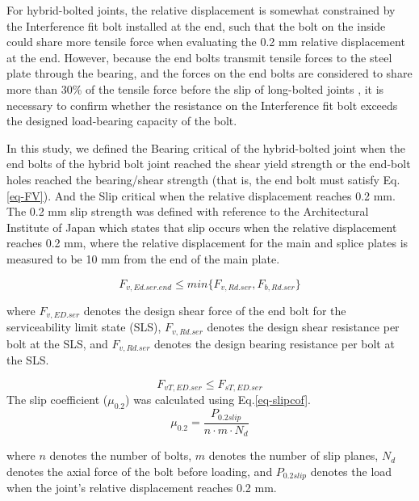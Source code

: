 For hybrid-bolted joints, the relative displacement is somewhat constrained by the Interference fit bolt installed at the end, such that the bolt on the inside could share more tensile force when evaluating the 0.2 mm relative displacement at the end. However, because the end bolts transmit tensile forces to the steel plate through the bearing, and the forces on the end bolts are considered to share more than 30\% of the tensile force before the slip of long-bolted joints \cite{Zhanghuazhi2000,chinarailway2005}, it is necessary to confirm whether the resistance on the Interference fit bolt exceeds the designed load-bearing capacity of the bolt. 

In this study, we defined the \ac{Bearing critical} of the hybrid-bolted joint when the end bolts of the hybrid bolt joint reached the shear yield strength or the end-bolt holes reached the bearing/shear strength (that is, the end bolt must satisfy Eq.\ref{eq-FV}). And the \ac{Slip critical} when the relative displacement reaches 0.2 mm. The \ac{0.2 mm slip} strength was defined with reference to the Architectural Institute of Japan \cite{AIJ2012AIJStructures} which states that slip occurs when the relative displacement reaches 0.2 mm, where the relative displacement for the main and splice plates is measured to be 10 mm from the end of the main plate. 

\begin{equation}
    F_{v,Ed.ser.end} \leq min\{F_{v,Rd.ser}, F_{b,Rd.ser}\}
    \label{eq-FV}
\end{equation}

where $F_{v,ED.ser}$ denotes the design shear force of the end bolt for the serviceability limit state (SLS), $F_{v,Rd.ser}$ denotes the design shear resistance per bolt at the SLS, and $F_{v,Rd.ser}$ denotes the design bearing resistance per bolt at the SLS.

\begin{equation}
    F_{vT,ED.ser} \leq F_{sT,ED.ser}
\end{equation}
The slip coefficient ($\mu_{0.2}$) was calculated using Eq.\ref{eq-slipcof}.
\begin{equation}
    \mu_{0.2} = \frac{P_{0.2slip}}{n \cdot m \cdot N_d}
    \label{eq-slipcof}
\end{equation}

where $n$ denotes the number of bolts, $m$ denotes the number of slip planes, $N_d$ denotes the axial force of the bolt before loading, and $P_{0.2slip}$ denotes the load when the joint's relative displacement reaches 0.2 mm.


